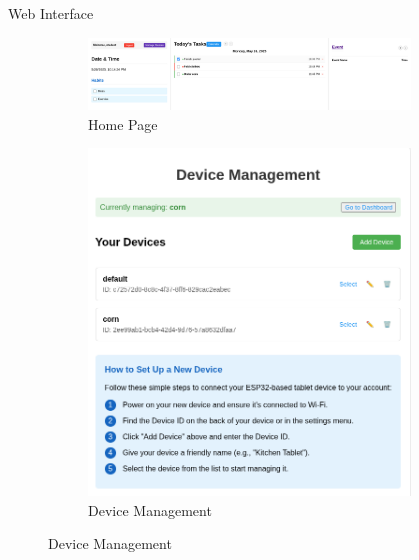 \documentclass[final]{beamer}
\newlength{\sepwidth}
\newlength{\colwidth}
\newcommand{\separatorcolumn}{\begin{column}{\sepwidth}\end{column}}
\begin{document}
\begin{frame}[t]
\begin{columns}[t]
\begin{column}{\colwidth}
      \begin{block}{Web Interface}
        \begin{figure}
          \begin{subfigure}{\textwidth}
            \includegraphics[width = \textwidth]{web_mainview.png}
            \caption{Home Page}
          \end{subfigure}
          \hfill
          \begin{subfigure}{0.49\textwidth}
            \includegraphics[width = \textwidth]{web_devices.png}
            \caption{Device Management}
          \end{subfigure}
        \end{figure}
      \end{block}

    \end{column}

    \separatorcolumn

  \end{columns}
\end{frame}
\end{document}

